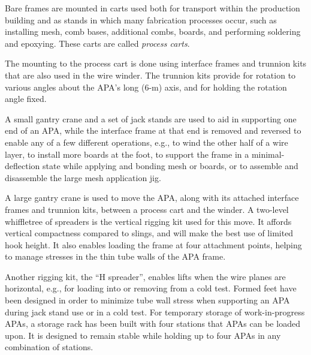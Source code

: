 Bare frames are mounted in carts used both for transport within the production building and as stands in which many fabrication processes occur, such as installing mesh, comb bases, additional combs, boards, and performing soldering and epoxying. These carts are called \textit{process carts}. 

The mounting to the process cart is done using interface frames and trunnion kits that are also used in the wire winder. The trunnion kits provide for rotation to various angles about the APA's long (6-m) axis, and for holding the rotation angle fixed.

A small gantry crane and a set of jack stands are used to aid in supporting one end of an APA, while the interface frame at that end is removed and reversed to enable any of a few different operations, e.g., to wind the other half of a wire layer, %
to install more boards at the foot, to support the frame in a minimal-deflection state while applying and bonding mesh or boards, or to assemble and disassemble the large mesh application jig. 

%
A large gantry crane is used to move the APA, along with its attached interface frames and trunnion kits, between a process cart and the winder. A two-level whiffletree of spreaders is the vertical rigging kit used for this move.  It affords vertical compactness compared to slings, and will make the best use of limited hook height. It also enables loading the frame at four attachment points, helping to manage stresses in the thin tube walls of the APA frame. 

Another rigging kit, the ``H spreader'', enables lifts when the wire planes are horizontal, e.g., for loading into or removing from a cold test. Formed feet have been designed %
in order to minimize tube wall stress when supporting an APA during jack stand use or in a cold test. For temporary storage of work-in-progress APAs, a storage rack has been built with four stations that APAs can be loaded upon. It is designed to remain stable while holding up to four APAs in any combination of stations. %

